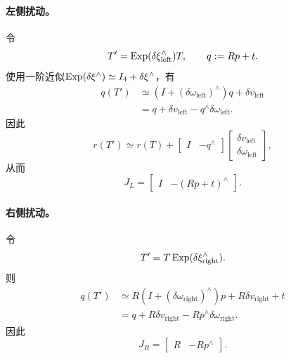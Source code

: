 \paragraph{左侧扰动。}
令
\[
    T'=\operatorname{Exp}(\delta\xi_{\mathrm{left}}^\wedge)T,
    \qquad
    q:=Rp+t.
\]
使用一阶近似$\operatorname{Exp}(\delta\xi^\wedge)\simeq I_4+\delta\xi^\wedge$，有
\[
\begin{aligned}
    q(T')
    &\simeq
    (I+(\delta\omega_{\mathrm{left}})^\wedge)q
    +\delta v_{\mathrm{left}}\\
    &=q+\delta v_{\mathrm{left}}
    -q^\wedge\delta\omega_{\mathrm{left}}.
\end{aligned}
\]
因此
\[
    r(T')
    \simeq r(T)
    +\begin{bmatrix}I&-q^\wedge\end{bmatrix}
    \begin{bmatrix}
        \delta v_{\mathrm{left}}\\
        \delta\omega_{\mathrm{left}}
    \end{bmatrix},
\]
从而
\[
    \boxed{
    J_L=
    \begin{bmatrix}
        I&-(Rp+t)^\wedge
    \end{bmatrix}.
    }
\]

\paragraph{右侧扰动。}
令
\[
    T'=T\operatorname{Exp}(\delta\xi_{\mathrm{right}}^\wedge).
\]
则
\[
\begin{aligned}
    q(T')
    &\simeq
    R(I+(\delta\omega_{\mathrm{right}})^\wedge)p
    +R\delta v_{\mathrm{right}}+t\\
    &=q+R\delta v_{\mathrm{right}}
    -R p^\wedge\delta\omega_{\mathrm{right}}.
\end{aligned}
\]
因此
\[
    \boxed{
    J_R=
    \begin{bmatrix}
        R&-R p^\wedge
    \end{bmatrix}.
    }
\]

